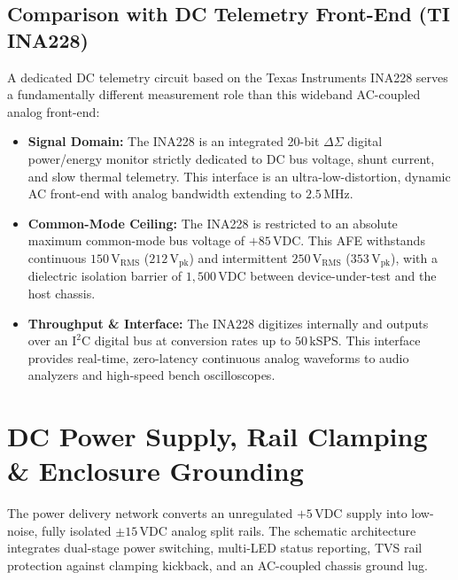 \documentclass[11pt, letterpaper]{article}
\begin{document}
\subsection{Comparison with DC Telemetry Front-End (TI INA228)}
A dedicated DC telemetry circuit based on the Texas Instruments INA228 serves a fundamentally different measurement role than this wideband AC-coupled analog front-end:
\begin{itemize}[leftmargin=1.5em]
    \item \textbf{Signal Domain:} The INA228 is an integrated 20-bit $\Delta\Sigma$ digital power/energy monitor strictly dedicated to DC bus voltage, shunt current, and slow thermal telemetry. This interface is an ultra-low-distortion, dynamic AC front-end with analog bandwidth extending to $2.5\,\text{MHz}$.
    \item \textbf{Common-Mode Ceiling:} The INA228 is restricted to an absolute maximum common-mode bus voltage of $+85\,\text{VDC}$. This AFE withstands continuous $150\,\text{V}_{\text{RMS}}$ ($212\,\text{V}_{\text{pk}}$) and intermittent $250\,\text{V}_{\text{RMS}}$ ($353\,\text{V}_{\text{pk}}$), with a dielectric isolation barrier of $1,500\,\text{VDC}$ between device-under-test and the host chassis.
    \item \textbf{Throughput \& Interface:} The INA228 digitizes internally and outputs over an $\text{I}^2\text{C}$ digital bus at conversion rates up to $50\,\text{kSPS}$. This interface provides real-time, zero-latency continuous analog waveforms to audio analyzers and high-speed bench oscilloscopes.
\end{itemize}

\section{DC Power Supply, Rail Clamping \& Enclosure Grounding}

The power delivery network converts an unregulated $+5\,\text{VDC}$ supply into low-noise, fully isolated $\pm 15\,\text{VDC}$ analog split rails. The schematic architecture integrates dual-stage power switching, multi-LED status reporting, TVS rail protection against clamping kickback, and an AC-coupled chassis ground lug.
\end{document}
